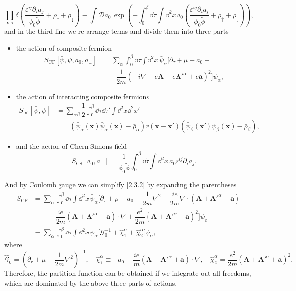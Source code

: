 \documentclass[bachelor,english,numbers]{ustcthesis}
\begin{document}
		\begin{equation*}
			\prod_{\bm{x},\tau}\delta\left(\dfrac{\varepsilon^{ij}\partial_i a_j}{\phi_0 \widetilde{\phi} }+\rho_\uparrow+\rho_\downarrow\right)\equiv\int \mathcal{D}a_0\,\exp \left(-\int_0^\beta\dd\tau\int\dd^2 x\,a_0\left(\dfrac{\varepsilon^{ij}\partial_i a_j}{\phi_0\widetilde{\phi}} +\rho_\uparrow+\rho_\downarrow\right) \right),
		\end{equation*}
		and in the third line we re-arrange terms and divide them into three parts
		\begin{itemize}
		\item the action of composite fermion 
			\begin{align}\label{2.3.2}
				S_{\text{CF}}[\bar{\psi},\psi,a_0,a_{\perp}]&=\sum_\alpha\int_0^\beta\dd\tau\int\dd^2 x\,\bar{\psi}_\alpha\bigg[\partial_\tau+\mu-a_0+\nonumber\\
				&\qquad\dfrac{1}{2m}(-i\nabla+e\bm{A}+e\bm{A'}^\alpha+e\bm{a})^2\bigg]\psi_\alpha,
			\end{align}
		\item the action of interacting composite fermions 
			\begin{align}\label{2.3.3}
				S_{\text{int}}[\bar{\psi},\psi]&=\sum_{\alpha \beta}\dfrac{1}{2}\int_0^\beta\dd\tau\dd\tau'\int\dd^2 x\dd^2 x'\nonumber\\
				&\qquad(\bar{\psi}_\alpha(\bm{x})\bar{\psi}_\alpha(\bm{x})-\bar{\rho}_\alpha)v(\bm{x}-\bm{x'})(\bar{\psi}_\beta(\bm{x'})\psi_\beta(\bm{x})-\bar{\rho}_\beta),
			\end{align}
		\item and the action of Chern-Simons field
			\begin{equation}\label{2.3.4}
				S_{\text{CS}}[a_0,a_{\perp}]=\dfrac{1}{\phi_0\widetilde{\phi}}\int_0^\beta\dd\tau\int\dd^2 x\,a_0 \varepsilon^{ij}\partial_i a_j.
			\end{equation}
		\end{itemize}
		And by Coulomb gauge we can simplify \eqref{2.3.2} by expanding the parentheses
		\begin{align}
			S_{\text{CF}}&=\sum_\alpha\int_0^\beta\dd\tau\int\dd^2x\,\bar{\psi}_\alpha\bigg[\partial_\tau+\mu-a_0-\dfrac{1}{2m}\nabla^2-\dfrac{ie}{2m}\nabla\cdot(\bm{A}+\bm{A'}^\alpha+\bm{a})\nonumber\\
			&\qquad-\dfrac{ie}{2m}(\bm{A}+\bm{A'}^\alpha+\bm{a})\cdot\nabla+\dfrac{e^2}{2m}(\bm{A}+\bm{A'}^\alpha+\bm{a})^2\bigg]\psi_\alpha\nonumber\\
			&=\sum_\alpha\int_0^\beta\dd\tau\int\dd^2x\,\bar{\psi}_\alpha\bigg[\mathcal{G}_0^{-1}+\hat{\chi}^\alpha_1+\hat{\chi}^\alpha_2\bigg]\psi_\alpha,\label{2.3.5}
		\end{align}
		where
		\begin{equation*}
			\hat{\mathcal{G}}_0=\left(\partial_\tau+\mu-\dfrac{1}{2m}\nabla^2\right)^{-1},\quad \hat{\chi}^\alpha_1\equiv -a_0-\dfrac{ie}{m}(\bm{A}+\bm{A'}^\alpha+\bm{a})\cdot\nabla,\quad \hat{\chi}^\alpha_2=\dfrac{e^2}{2m}(\bm{A}+\bm{A'}^\alpha+\bm{a})^2.
		\end{equation*}
		Therefore, the partition function can be obtained if we integrate out all freedoms, which are dominated by the above three parts of actions.
	
\end{document}
